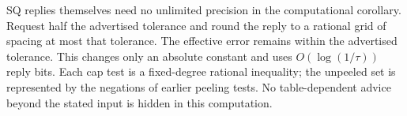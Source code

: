 SQ replies themselves need no unlimited precision in the computational corollary. Request half the advertised tolerance and round the reply to a rational grid of spacing at most that tolerance. The effective error remains within the advertised tolerance. This changes only an absolute constant and uses $O(\log(1/\tau))$ reply bits. Each cap test is a fixed-degree rational inequality; the unpeeled set is represented by the negations of earlier peeling tests. No table-dependent advice beyond the stated input is hidden in this computation.
